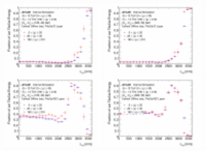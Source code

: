 \begin{figure}[hbtp]
\begin{center}
\includegraphics[width=0.47\textwidth]{figures/caloratio1.pdf}
\includegraphics[width=0.47\textwidth]{figures/caloratio2.pdf}\\
\includegraphics[width=0.47\textwidth]{figures/caloratio3.pdf}
\includegraphics[width=0.47\textwidth]{figures/caloratio4.pdf}\\
\caption{ %
}
\label{fig:Caloratio}
\end{center}
\end{figure}


